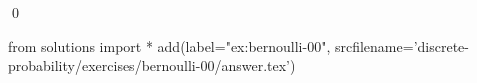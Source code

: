 
\begin{ex} 
  \label{ex:bernoulli-00}
  
  \qed
\end{ex} 
\begin{python0}
from solutions import *
add(label="ex:bernoulli-00",
    srcfilename='discrete-probability/exercises/bernoulli-00/answer.tex') 
\end{python0}
